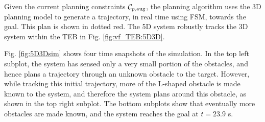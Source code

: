 Given the current planning constraints $\mathcal C_{p,\text{aug}}$, the planning algorithm uses the 3D planning model to generate a trajectory, in real time using FSM, towards the goal.
This plan is shown in dotted red.
The 5D system robustly tracks the 3D system within the TEB in Fig. \ref{fig:vf_TEB:5D3D}.

Fig. \ref{fig:5D3Dsim} shows four time snapshots of the simulation.
In the top left subplot, the system has sensed only a very small portion of the obstacles, and hence plans a trajectory through an unknown obstacle to the target.
However, while tracking this initial trajectory, more of the L-shaped obstacle is made known to the system, and therefore the system plans around this obstacle, as shown in the top right subplot.
The bottom subplots show that eventually more obstacles are made known, and the system reaches the goal at $t=23.9$ s.

